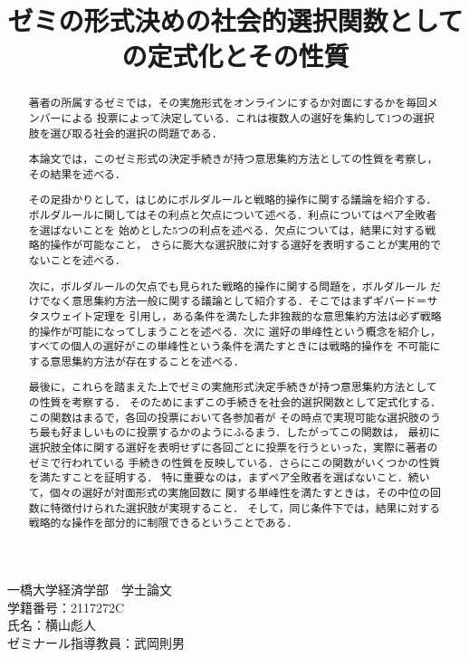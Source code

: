 \documentclass[dvipdfmx]{jsarticle}
\begin{document}
\title{ゼミの形式決めの社会的選択関数としての定式化とその性質}
\author{}
\date{}
\maketitle


\begin{center}
  一橋大学経済学部　学士論文\\
  学籍番号：2117272C\\
  氏名：横山彪人\\
  ゼミナール指導教員：武岡則男
\end{center}




\vfill
\begin{abstract}
  著者の所属するゼミでは，その実施形式をオンラインにするか対面にするかを毎回メンバーによる
  投票によって決定している．これは複数人の選好を集約して1つの選択肢を選び取る社会的選択の問題である．
  
  本論文では，このゼミ形式の決定手続きが持つ意思集約方法としての性質を考察し，その結果を述べる．
  
  その足掛かりとして，はじめにボルダルールと戦略的操作に関する議論を紹介する．
  ボルダルールに関してはその利点と欠点について述べる．利点についてはペア全敗者を選ばないことを
  始めとした5つの利点を述べる．欠点については，結果に対する戦略的操作が可能なこと，
  さらに膨大な選択肢に対する選好を表明することが実用的でないことを述べる．
  
  次に，ボルダルールの欠点でも見られた戦略的操作に関する問題を，ボルダルール
  だけでなく意思集約方法一般に関する議論として紹介する．そこではまずギバード＝サタスウェイト定理を
  引用し，ある条件を満たした非独裁的な意思集約方法は必ず戦略的操作が可能になってしまうことを述べる．次に
  選好の単峰性という概念を紹介し，すべての個人の選好がこの単峰性という条件を満たすときには戦略的操作を
  不可能にする意思集約方法が存在することを述べる．
  
  最後に，これらを踏まえた上でゼミの実施形式決定手続きが持つ意思集約方法としての性質を考察する．
  そのためにまずこの手続きを社会的選択関数として定式化する．この関数はまるで，各回の投票において各参加者が
  その時点で実現可能な選択肢のうち最も好ましいものに投票するかのようにふるまう．したがってこの関数は，
  最初に選択肢全体に関する選好を表明せずに各回ごとに投票を行うといった，実際に著者のゼミで行われている
  手続きの性質を反映している．さらにこの関数がいくつかの性質を満たすことを証明する．
  特に重要なのは，まずペア全敗者を選ばないこと．続いて，個々の選好が対面形式の実施回数に
  関する単峰性を満たすときは，その中位の回数に特徴付けられた選択肢が実現すること．
  そして，同じ条件下では，結果に対する戦略的な操作を部分的に制限できるということである．\\
\end{abstract}
\vfill
\end{document}
